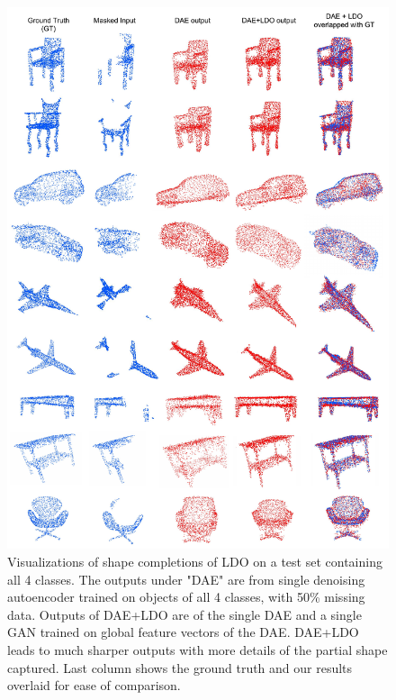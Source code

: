 \documentclass[10pt,twocolumn,letterpaper]{article}
\begin{document}
\begin{figure}
\vspace{-15pt}
\begin{center}
\includegraphics[width=1\linewidth]{dae_ldo_result_pic_wacv.pdf}
\end{center}
\vspace{-15pt}
   \caption{Visualizations of shape completions of LDO on a test set containing all 4 classes. The outputs under "DAE" are from single denoising autoencoder trained on objects of all 4 classes, with 50\% missing data. Outputs of DAE+LDO are of the single DAE and a single GAN trained on global feature vectors of the DAE. DAE+LDO leads to much sharper outputs with more details of the partial shape captured. Last column shows the ground truth and our results overlaid for ease of comparison.}
   \vspace{-15pt}
\label{fig:results}
\end{figure}
\end{document}
